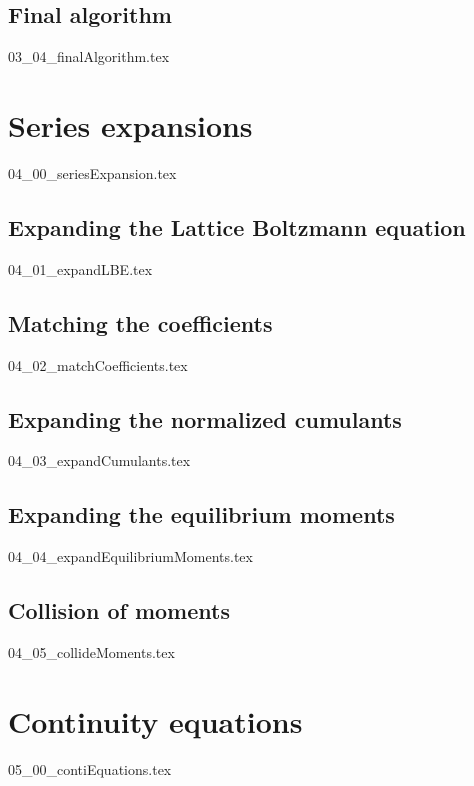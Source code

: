 \documentclass[12pt,a4paper,twoside]{article}
\begin{document}
\subsection{Final algorithm}
\label{sub: Final algorithm}
{03_04_finalAlgorithm.tex}

\section{Series expansions}
\label{sec: Series expansions}
{04_00_seriesExpansion.tex}


\subsection{Expanding the Lattice Boltzmann equation}
\label{sub: Expanding the Lattice Boltzmann equation}
{04_01_expandLBE.tex}

\subsection{Matching the coefficients}
\label{sub: Matching the coefficients}
{04_02_matchCoefficients.tex}

\subsection{Expanding the normalized cumulants}
\label{sub: Expanding the normalized cumulants}
{04_03_expandCumulants.tex}

\subsection{Expanding the equilibrium moments}
\label{sub: Expanding the equilibrium moments}
{04_04_expandEquilibriumMoments.tex}

\subsection{Collision of moments}
\label{sub: Collision of moments}
{04_05_collideMoments.tex}

\section{Continuity equations}
\label{sec: Continuity equations}
{05_00_contiEquations.tex}
\end{document}
